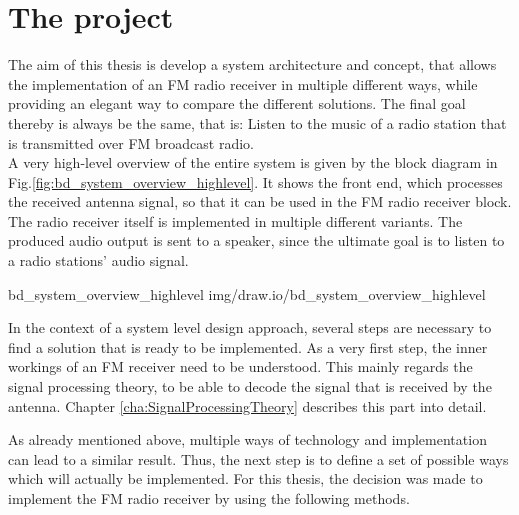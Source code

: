 \section{The project}

The aim of this thesis is develop a system architecture and concept, that allows the implementation of an FM radio receiver in multiple different ways, while providing an elegant way to compare the different solutions.
The final goal thereby is always be the same, that is: Listen to the music of a radio station that is transmitted over FM broadcast radio.\\

\noindent
A very high-level overview of the entire system is given by the block diagram in Fig.\ref{fig:bd_system_overview_highlevel}.
It shows the front end, which processes the received antenna signal, so that it can be used in the FM radio receiver block.
The radio receiver itself is implemented in multiple different variants.
The produced audio output is sent to a speaker, since the ultimate goal is to listen to a radio stations' audio signal.

 {bd_system_overview_highlevel} {img/draw.io/bd_system_overview_highlevel}

In the context of a system level design approach, several steps are necessary to find a solution that is ready to be implemented.
As a very first step, the inner workings of an FM receiver need to be understood.
This mainly regards the signal processing theory, to be able to decode the signal that is received by the antenna.
Chapter \ref{cha:SignalProcessingTheory} describes this part into detail.

As already mentioned above, multiple ways of technology and implementation can lead to a similar result.
Thus, the next step is to define a set of possible ways which will actually be implemented.
For this thesis, the decision was made to implement the FM radio receiver by using the following methods.

